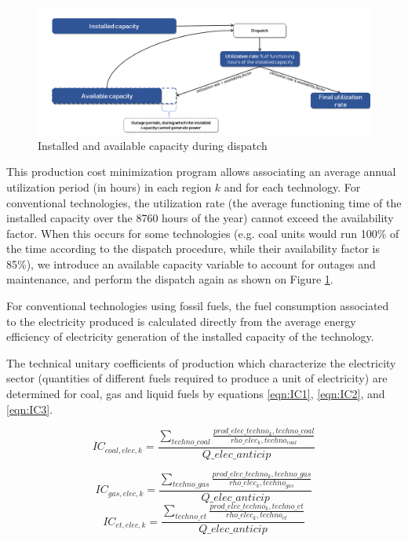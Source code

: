 {\begin{figure}[H]
\includegraphics[scale=0.4]{figures&tables/availb.png}
\centering
\caption{Installed and available capacity during dispatch}
\label{fig:avail}
\end{figure}


This production cost minimization program allows  associating an average annual utilization period (in hours) in each region $k$ and for each technology. For conventional technologies, the utilization rate (the average functioning time of the installed capacity over the 8760 hours of the year) cannot exceed the availability factor. When this occurs for some technologies (e.g. coal units would run 100\% of the time according to the dispatch procedure, while their availability factor is 85\%), we introduce an available capacity variable to account for outages and maintenance, and perform the dispatch again as shown on Figure \ref{fig:avail}. 

For conventional technologies using fossil fuels, the fuel consumption associated to the electricity produced is calculated directly from the average energy efficiency of electricity generation of the installed capacity of the technology.

The technical unitary coefficients of production which characterize the electricity sector (quantities of different fuels required to produce a unit of electricity) are determined for coal, gas and liquid fuels by equations \ref{eqn:IC1}, \ref{eqn:IC2}, and  \ref{eqn:IC3}.

\begin{equation}
    IC_{coal,elec,k} = \frac{\sum_{techno\_coal}  \frac{prod\_elec\_techno_k,techno\_coal}{rho\_elec_k,techno_{coal}}}{Q\_elec\_anticip}
    \label{eqn:IC1}
\end{equation}

\begin{equation}
    IC_{gas,elec,k} = \frac{\sum_{techno\_gas}  \frac{prod\_elec\_techno_k,techno\_gas}{rho\_elec_k,techno_{gas}}}{Q\_elec\_anticip}
    \label{eqn:IC2}
\end{equation}
\begin{equation}
    IC_{et,elec,k} = \frac{\sum_{techno\_et}  \frac{prod\_elec\_techno_k,techno\_et}{rho\_elec_k,techno_{et}}}{Q\_elec\_anticip}
    \label{eqn:IC3}
\end{equation}

}
